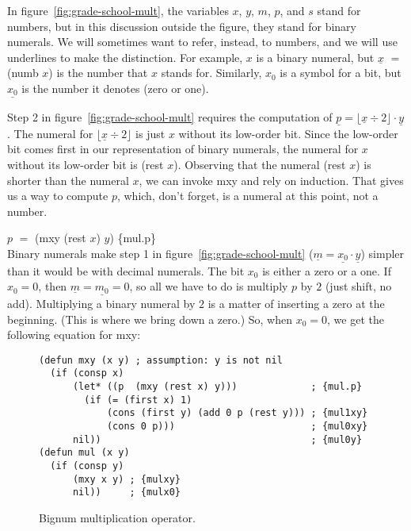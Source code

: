 In figure~\ref{fig:grade-school-mult}, the variables $x$, $y$, $m$, $p$, and $s$
stand for numbers, but in this discussion outside the figure,
they stand for binary numerals.
We will sometimes want to refer, instead, to numbers,
and we will use underlines to make the distinction.
For example, $x$ is a binary numeral,
but $\underline{x}$ $=$ \textsf{(numb $x$)}
is the number that $x$ stands for.
Similarly, $x_0$ is a symbol for a bit,
but $\underline{x_0}$ is the number it denotes (zero or one).

Step 2 in figure~\ref{fig:grade-school-mult} requires the computation of
$\underline{p} = \lfloor \underline{x} \div 2 \rfloor \cdot \underline{y}$.
The numeral for $\lfloor \underline{x} \div 2 \rfloor$ is just $x$ without its
low-order bit. Since the low-order bit comes first
in our representation of binary numerals,
the numeral for $x$ without its low-order bit is \textsf{(rest $x$)}.
Observing that the numeral \textsf{(rest $x$)}
is shorter than the numeral $x$,
we can invoke \textsf{mxy} and rely on induction.
That gives us a way to compute $p$, which, don't forget,
is a numeral at this point, not a number.

\vspace{2mm}\hspace*{2cm} $p$ $=$ \textsf{(mxy (rest $x$) $y$)} \hfill \{mul.p\}\\

Binary numerals make step 1 in figure~\ref{fig:grade-school-mult}
($\underline{m} = \underline{x_0} \cdot \underline{y}$)
simpler than it would be with decimal numerals.
The bit $x_0$ is either a zero or a one.
If $x_0 = 0$, then $\underline{m} = \underline{m_0} = 0$, so all
we have to do is multiply $p$ by $2$ (just shift, no add).
Multiplying a binary numeral by $2$ is a matter
of inserting a zero at the beginning.
(This is where we bring down a zero.)
So, when $x_0 = 0$, we get the following equation for \textsf{mxy}:

\begin{figure}
\begin{code}
\begin{verbatim}
(defun mxy (x y) ; assumption: y is not nil
  (if (consp x)
      (let* ((p  (mxy (rest x) y)))             ; {mul.p}
        (if (= (first x) 1)
            (cons (first y) (add 0 p (rest y))) ; {mul1xy}
            (cons 0 p)))                        ; {mul0xy}
      nil))                                     ; {mul0y}
(defun mul (x y)
  (if (consp y)
      (mxy x y) ; {mulxy}
      nil))     ; {mulx0}
\end{verbatim}
\end{code}
\label{bignum-mul-defun}
\caption{Bignum multiplication operator.}
\label{fig:bignum-mul-defun}
\end{figure}

